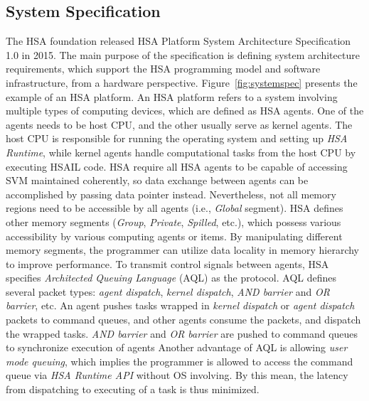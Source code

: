         \subsection{System Specification}
        The HSA foundation released HSA Platform System Architecture Specification 1.0 \cite{systemspec} in 2015.
        The main purpose of the specification is defining system architecture requirements, 
        which support the HSA programming model and software infrastructure, from a hardware perspective.
        Figure~\ref{fig:systemspec} presents the example of an HSA platform.
        An HSA platform refers to a system involving multiple types of computing devices, 
        which are defined as HSA agents.
        One of the agents needs to be host CPU, and the other usually serve as kernel agents. 
        The host CPU is responsible for running the operating system and setting up \textit{HSA Runtime},
        while kernel agents handle computational tasks from the host CPU by executing HSAIL code.
        HSA require all HSA agents to be capable of accessing SVM maintained coherently, 
        so data exchange between agents can be accomplished by passing data pointer instead.
        Nevertheless, not all memory regions need to be accessible by all agents (i.e., \textit{Global} segment).
        HSA defines other memory segments (\textit{Group}, \textit{Private}, \textit{Spilled}, etc.), 
        which possess various accessibility by various computing agents or items.
        By manipulating different memory segments, the programmer can utilize data locality in memory hierarchy to improve performance.
        To transmit control signals between agents, HSA specifies \textit{Architected Queuing Language} (AQL) as the protocol. 
        AQL defines several packet types: \textit{agent dispatch}, \textit{kernel dispatch}, \textit{AND barrier} and \textit{OR barrier}, etc.
        An agent pushes tasks wrapped in \textit{kernel dispatch} or \textit{agent dispatch} packets to command queues, 
        and other agents consume the packets, and dispatch the wrapped tasks.
        \textit{AND barrier} and \textit{OR barrier} are pushed to command queues to synchronize execution of agents 
        Another advantage of AQL is allowing \textit{user mode queuing},
        which implies the programmer is allowed to access the command queue via \textit{HSA Runtime API} without OS involving.
        By this mean, the latency from dispatching to executing of a task is thus minimized.
